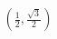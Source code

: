 \documentclass[preview]{standalone}
\begin{document}
\begin{align*}
\left(\frac{1}{2}, \frac{\sqrt{3}}{2}\right)
\end{align*}
\end{document}
